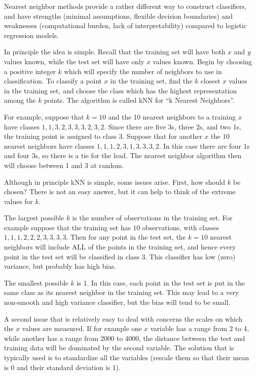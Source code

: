\documentclass[
]{krantz}
\begin{document}
Nearest neighbor methods provide a rather different way to construct classifiers, and have strengths (minimal assumptions, flexible decision boundaries) and weaknesses (computational burden, lack of interpretability) compared to logistic regression models.

In principle the idea is simple. Recall that the training set will have both \(x\) and \(y\) values known, while the test set will have only \(x\) values known. Begin by choosing a positive integer \(k\) which will specify the number of neighbors to use in classification. To classify a point \(x\) in the training set, find the \(k\) closest \(x\) values in the training set, and choose the class which has the highest representation among the \(k\) points. The algorithm is called kNN for ``k Nearest Neighbors''.

For example, suppose that \(k=10\) and the 10 nearest neighbors to a training \(x\) have classes \(1, 1, 3, 2, 3, 3, 3, 2, 3, 2\). Since there are five 3s, three 2s, and two 1s, the training point is assigned to class 3. Suppose that for another \(x\) the 10 nearest neighbors have classes \(1,1,1,2,3,1,3,3,3,2\). In this case there are four 1s and four 3s, so there is a tie for the lead. The nearest neighbor algorithm then will choose between 1 and 3 at random.

Although in principle kNN is simple, some issues arise. First, how should \(k\) be chosen? There is not an easy answer, but it can help to think of the extreme values for \(k\).

The largest possible \(k\) is the number of observations in the training set. For example suppose that the training set has \(10\) observations, with classes \(1, 1, 1, 2, 2, 2, 3, 3, 3, 3\). Then for any point in the test set, the \(k=10\) nearest neighbors will include ALL of the points in the training set, and hence every point in the test set will be classified in class 3. This classifier has low (zero) variance, but probably has high bias.

The smallest possible \(k\) is 1. In this case, each point in the test set is put in the same class as its nearest neighbor in the training set. This may lead to a very non-smooth and high variance classifier, but the bias will tend to be small.

A second issue that is relatively easy to deal with concerns the scales on which the \(x\) values are measured. If for example one \(x\) variable has a range from 2 to 4, while another has a range from 2000 to 4000, the distance between the test and training data will be dominated by the second variable. The solution that is typically used is to standardize all the variables (rescale them so that their mean is 0 and their standard deviation is 1).
\end{document}
